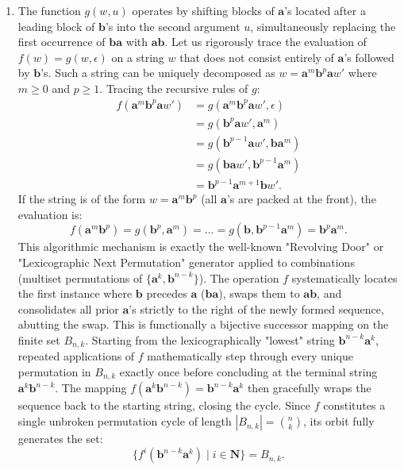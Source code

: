 \documentclass[10pt,a4paper]{article}
\begin{document}
\begin{enumerate}[label=\fbox{\arabic*}]
  \item %
        The function $g(w, u)$ operates by shifting blocks of $\mathbf{a}$'s located after a leading block of $\mathbf{b}$'s into the second argument $u$, simultaneously replacing the first occurrence of $\mathbf{b}\mathbf{a}$ with $\mathbf{a}\mathbf{b}$.
        Let us rigorously trace the evaluation of $f(w) = g(w, \epsilon)$ on a string $w$ that does not consist entirely of $\mathbf{a}$'s followed by $\mathbf{b}$'s. Such a string can be uniquely decomposed as $w = \mathbf{a}^m \mathbf{b}^p \mathbf{a} w'$ where $m \ge 0$ and $p \ge 1$.
        Tracing the recursive rules of $g$:
        \begin{align*}
          f(\mathbf{a}^m \mathbf{b}^p \mathbf{a} w') &= g(\mathbf{a}^m \mathbf{b}^p \mathbf{a} w', \epsilon) \\
          &= g(\mathbf{b}^p \mathbf{a} w', \mathbf{a}^m) \\
          &= g(\mathbf{b}^{p-1} \mathbf{a} w', \mathbf{b} \mathbf{a}^m) \\
          &= g(\mathbf{b} \mathbf{a} w', \mathbf{b}^{p-1} \mathbf{a}^m) \\
          &= \mathbf{b}^{p-1} \mathbf{a}^{m+1} \mathbf{b} w'.
        \end{align*}
        If the string is of the form $w = \mathbf{a}^m \mathbf{b}^p$ (all $\mathbf{a}$'s are packed at the front), the evaluation is:
        \[
          f(\mathbf{a}^m \mathbf{b}^p) = g(\mathbf{b}^p, \mathbf{a}^m) = \dots = g(\mathbf{b}, \mathbf{b}^{p-1} \mathbf{a}^m) = \mathbf{b}^p \mathbf{a}^m.
        \]
        This algorithmic mechanism is exactly the well-known "Revolving Door" or "Lexicographic Next Permutation" generator applied to combinations (multiset permutations of $\{\mathbf{a}^k, \mathbf{b}^{n-k}\}$). 
        The operation $f$ systematically locates the first instance where $\mathbf{b}$ precedes $\mathbf{a}$ ($\mathbf{b}\mathbf{a}$), swaps them to $\mathbf{a}\mathbf{b}$, and consolidates all prior $\mathbf{a}$'s strictly to the right of the newly formed sequence, abutting the swap. 
        This is functionally a bijective successor mapping on the finite set $B_{n,k}$. Starting from the lexicographically "lowest" string $\mathbf{b}^{n-k}\mathbf{a}^k$, repeated applications of $f$ mathematically step through every unique permutation in $B_{n,k}$ exactly once before concluding at the terminal string $\mathbf{a}^k \mathbf{b}^{n-k}$. The mapping $f(\mathbf{a}^k \mathbf{b}^{n-k}) = \mathbf{b}^{n-k} \mathbf{a}^k$ then gracefully wraps the sequence back to the starting string, closing the cycle.
        Since $f$ constitutes a single unbroken permutation cycle of length $|B_{n,k}| = \binom{n}{k}$, its orbit fully generates the set:
        \[
          \{ f^i(\mathbf{b}^{n-k}\mathbf{a}^k) \mid i \in \mathbf{N} \} = B_{n,k}.
        \]
\end{enumerate}
\end{document}
